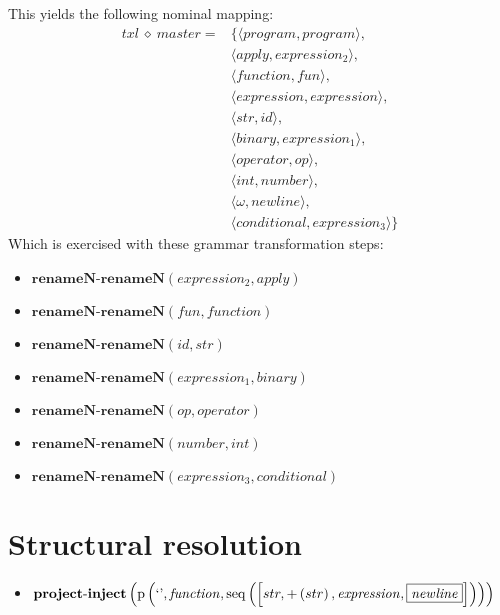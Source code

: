 This yields the following nominal mapping:
\begin{align*}\mathit{txl} \:\diamond\: \mathit{master} =& \{\langle \mathit{program},\mathit{program}\rangle,\\
 & \langle \mathit{apply},\mathit{expression_2}\rangle,\\
 & \langle \mathit{function},\mathit{fun}\rangle,\\
 & \langle \mathit{expression},\mathit{expression}\rangle,\\
 & \langle str,\mathit{id}\rangle,\\
 & \langle \mathit{binary},\mathit{expression_1}\rangle,\\
 & \langle \mathit{operator},\mathit{op}\rangle,\\
 & \langle int,\mathit{number}\rangle,\\
 & \langle \omega,\mathit{newline}\rangle,\\
 & \langle \mathit{conditional},\mathit{expression_3}\rangle\}\end{align*}
 Which is exercised with these grammar transformation steps:

{\footnotesize\begin{itemize}
\item $\mathbf{renameN\text{-}renameN}\left(\mathit{expression_2},\mathit{apply}\right)$
\item $\mathbf{renameN\text{-}renameN}\left(\mathit{fun},\mathit{function}\right)$
\item $\mathbf{renameN\text{-}renameN}\left(\mathit{id},str\right)$
\item $\mathbf{renameN\text{-}renameN}\left(\mathit{expression_1},\mathit{binary}\right)$
\item $\mathbf{renameN\text{-}renameN}\left(\mathit{op},\mathit{operator}\right)$
\item $\mathbf{renameN\text{-}renameN}\left(\mathit{number},int\right)$
\item $\mathbf{renameN\text{-}renameN}\left(\mathit{expression_3},\mathit{conditional}\right)$
\end{itemize}}

\section{Structural resolution}
{\footnotesize\begin{itemize}
\item $\mathbf{project\text{-}inject}\\\left(\mathrm{p}\left(\text{`'},\mathit{function},\mathrm{seq}\left(\left[str, {+}\left(str\right), \mathit{expression}, \fbox{$\mathit{newline}$}\right]\right)\right)\right)$
\end{itemize}}
